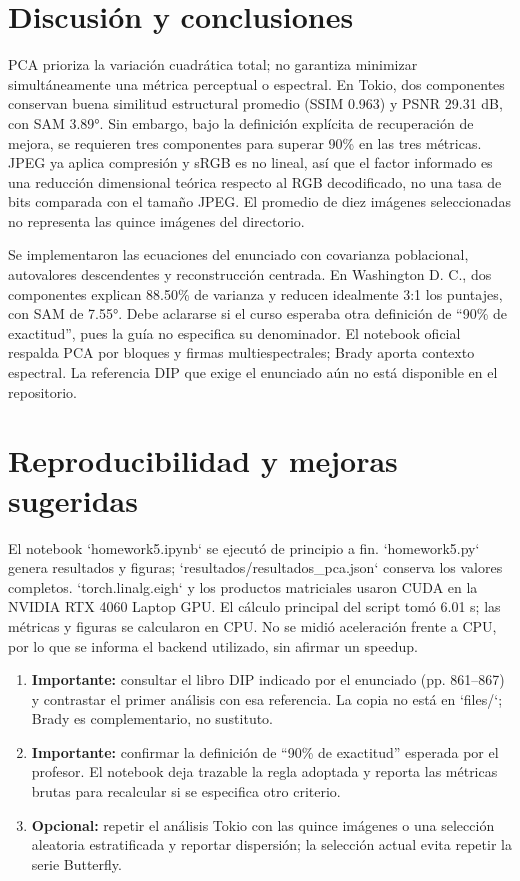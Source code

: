 \documentclass[11pt,a4paper]{article}
\begin{document}
\section{Discusión y conclusiones}
PCA prioriza la variación cuadrática total; no garantiza minimizar simultáneamente una métrica perceptual o espectral. En Tokio, dos componentes conservan buena similitud estructural promedio (SSIM 0.963) y PSNR 29.31 dB, con SAM 3.89°. Sin embargo, bajo la definición explícita de recuperación de mejora, se requieren tres componentes para superar 90\% en las tres métricas. JPEG ya aplica compresión y sRGB es no lineal, así que el factor informado es una reducción dimensional teórica respecto al RGB decodificado, no una tasa de bits comparada con el tamaño JPEG. El promedio de diez imágenes seleccionadas no representa las quince imágenes del directorio.

Se implementaron las ecuaciones del enunciado con covarianza poblacional, autovalores descendentes y reconstrucción centrada. En Washington D. C., dos componentes explican 88.50\% de varianza y reducen idealmente 3:1 los puntajes, con SAM de 7.55°. Debe aclararse si el curso esperaba otra definición de “90\% de exactitud”, pues la guía no especifica su denominador. El notebook oficial respalda PCA por bloques y firmas multiespectrales; Brady aporta contexto espectral. La referencia DIP que exige el enunciado aún no está disponible en el repositorio.

\section{Reproducibilidad y mejoras sugeridas}
El notebook `homework5.ipynb` se ejecutó de principio a fin. `homework5.py` genera resultados y figuras; `resultados/resultados\_pca.json` conserva los valores completos. `torch.linalg.eigh` y los productos matriciales usaron CUDA en la NVIDIA RTX 4060 Laptop GPU. El cálculo principal del script tomó 6.01 s; las métricas y figuras se calcularon en CPU. No se midió aceleración frente a CPU, por lo que se informa el backend utilizado, sin afirmar un speedup.

\begin{enumerate}[leftmargin=*]
\item \textbf{Importante:} consultar el libro DIP indicado por el enunciado (pp. 861--867) y contrastar el primer análisis con esa referencia. La copia no está en `files/`; Brady es complementario, no sustituto.
\item \textbf{Importante:} confirmar la definición de “90\% de exactitud” esperada por el profesor. El notebook deja trazable la regla adoptada y reporta las métricas brutas para recalcular si se especifica otro criterio.
\item \textbf{Opcional:} repetir el análisis Tokio con las quince imágenes o una selección aleatoria estratificada y reportar dispersión; la selección actual evita repetir la serie Butterfly.
\end{enumerate}
\end{document}
